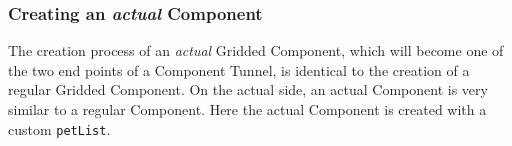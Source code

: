  
\setlength{\oldparskip}{\parskip}
\setlength{\parskip}{1.5ex}
\setlength{\oldparindent}{\parindent}
\setlength{\parindent}{0pt}
\setlength{\oldbaselineskip}{\baselineskip}
\setlength{\baselineskip}{11pt}
 
\def\bv{\begin{verbatim}}
\def\ev{\end{verbatim}}
\def\be{\begin{equation}}
\def\ee{\end{equation}}
\def\bea{\begin{eqnarray}}
\def\eea{\end{eqnarray}}
\def\bi{\begin{itemize}}
\def\ei{\end{itemize}}
\def\bn{\begin{enumerate}}
\def\en{\end{enumerate}}
\def\bd{\begin{description}}
\def\ed{\end{description}}
\def\({\left (}
\def\){\right )}
\def\[{\left [}
\def\]{\right ]}
\def\<{\left  \langle}
\def\>{\right \rangle}
\def\cI{{\cal I}}
\def\diag{\mathop{\rm diag}}
\def\tr{\mathop{\rm tr}}


 

  \subsubsection{Creating an {\em actual} Component}
   
   \label{sec:CompTunnelActualCreate}
  
   The creation process of an {\em actual} Gridded Component, which will become
   one of the two end points of a Component Tunnel, is identical to the creation
   of a regular Gridded Component. On the actual side, an actual Component is 
   very similar to a regular Component. Here the actual Component is created
   with a custom {\tt petList}. 

